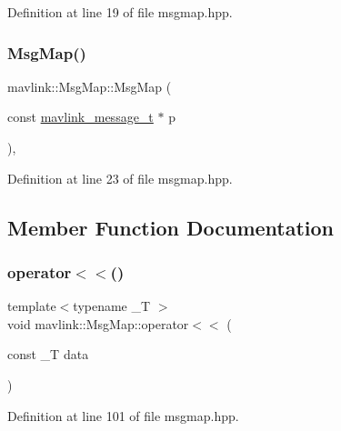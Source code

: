 Definition at line 19 of file msgmap.\+hpp.

\mbox{\label{classmavlink_1_1MsgMap_a7e797cf94f826dfe13ff2e412b49e743}} 
\subsubsection{\texorpdfstring{MsgMap()}{MsgMap()}\hspace{0.1cm}{\footnotesize\ttfamily [3/3]}}
{\footnotesize\ttfamily mavlink\+::\+Msg\+Map\+::\+Msg\+Map (\begin{DoxyParamCaption}\item[{const \mbox{\hyperlink{include__v0_89_2mavlink__types_8h_a63b963764c09dc72f4910c1521e325b9}{mavlink\+\_\+message\+\_\+t}} $\ast$}]{p }\end{DoxyParamCaption})\hspace{0.3cm}{\ttfamily [inline]}, {\ttfamily [explicit]}}



Definition at line 23 of file msgmap.\+hpp.



\subsection{Member Function Documentation}
\mbox{\label{classmavlink_1_1MsgMap_a79d04c1d99bad57f67763dd3ffc202e5}} 
\subsubsection{\texorpdfstring{operator$<$$<$()}{operator<<()}\hspace{0.1cm}{\footnotesize\ttfamily [1/2]}}
{\footnotesize\ttfamily template$<$typename \+\_\+T $>$ \\
void mavlink\+::\+Msg\+Map\+::operator$<$$<$ (\begin{DoxyParamCaption}\item[{const \+\_\+T}]{data }\end{DoxyParamCaption})}



Definition at line 101 of file msgmap.\+hpp.

